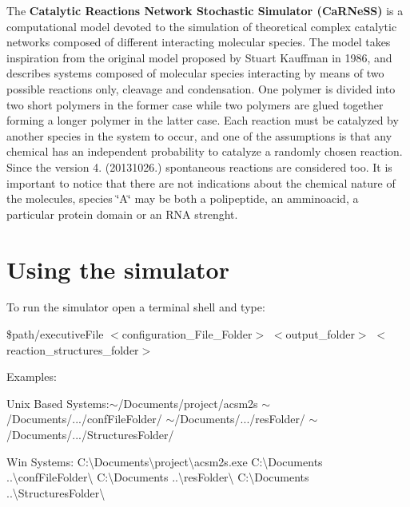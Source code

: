 

 The {\bfseries Catalytic Reactions Network Stochastic Simulator (Ca\-R\-Ne\-S\-S)} is a computational model devoted to the simulation of theoretical complex catalytic networks composed of different interacting molecular species. The model takes inspiration from the original model proposed by Stuart Kauffman in 1986, and describes systems composed of molecular species interacting by means of two possible reactions only, cleavage and condensation. One polymer is divided into two short polymers in the former case while two polymers are glued together forming a longer polymer in the latter case. Each reaction must be catalyzed by another species in the system to occur, and one of the assumptions is that any chemical has an independent probability to catalyze a randomly chosen reaction. Since the version 4. (20131026.) spontaneous reactions are considered too. It is important to notice that there are not indications about the chemical nature of the molecules, species \char`\"{}\-A\char`\"{} may be both a polipeptide, an amminoacid, a particular protein domain or an R\-N\-A strenght.\par
\par
 \hypertarget{a00002_secUsage}{}\section{Using the simulator}\label{a00002_secUsage}
To run the simulator open a terminal shell and type\-:\par
\par
 {\ttfamily } \$path/executive\-File {\ttfamily } $<$configuration\-\_\-\-File\-\_\-\-Folder$>$ {\ttfamily } $<$output\-\_\-folder$>$ {\ttfamily } $<$reaction\-\_\-structures\-\_\-folder$>$\par
 Examples\-:
\begin{DoxyItemize}
\item Unix Based Systems\-:{\ttfamily $\sim$/\-Documents/project/acsm2s} {\ttfamily $\sim$/\-Documents/}.../conf\-File\-Folder/ {\ttfamily $\sim$/\-Documents/}.../res\-Folder/ {\ttfamily $\sim$/\-Documents/}.../\-Structures\-Folder/
\item Win Systems\-: {\ttfamily C\-:\textbackslash{}Documents\textbackslash{}project\textbackslash{}acsm2s.\-exe} {\ttfamily C\-:\textbackslash{}Documents} ..\textbackslash{}conf\-File\-Folder\textbackslash{} {\ttfamily C\-:\textbackslash{}Documents} ..\textbackslash{}res\-Folder\textbackslash{} {\ttfamily C\-:\textbackslash{}Documents} ..\textbackslash{}Structures\-Folder\textbackslash{}
\end{DoxyItemize}

